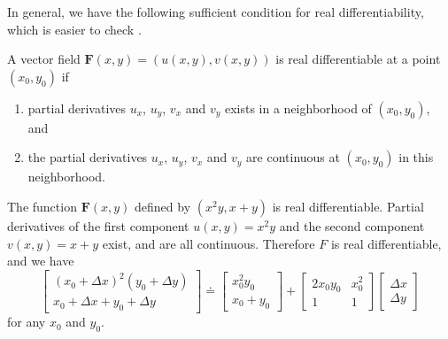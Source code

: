 In general, we have the following sufficient condition for real differentiability, which is easier to check \cite[Theorem 9.21]{Rudin}.

\renewcommand{\labelenumi}{(\roman{enumi}).}
\begin{svgraybox} 		\label{thm:real_sufficient}
	\begin{theorem} A vector field $\mathbf{F}(x,y) = (u(x,y), v(x,y))$ is real differentiable at a point $(x_0,y_0)$ if 
\begin{enumerate}
\item partial derivatives $u_x$, $u_y$, $v_x$ and $v_y$ exists in a neighborhood of $(x_0,y_0)$, and 
\item the partial derivatives $u_x$, $u_y$, $v_x$ and $v_y$ are continuous at $(x_0,y_0)$ in this neighborhood.
\end{enumerate}
	\end{theorem}
\end{svgraybox}



\begin{example}
	The function $\mathbf{F}(x,y)$ defined by $(x^2y, x+y)$ is real differentiable. Partial derivatives of the first component $u(x,y)=x^2y$ and the second component $v(x,y)=x+y$ exist, and are all continuous. Therefore $F$ is real differentiable, 	
	 and we have
	\begin{equation}
		\begin{bmatrix}(x_0+\Delta x)^2 (y_0 + \Delta y)\\ x_0+\Delta x + y_0 + \Delta y \end{bmatrix}
		\doteq
		\begin{bmatrix}x_0^2 y_0 \\ x_0+y_0 \end{bmatrix} +
		\begin{bmatrix} 2x_0y_0 & x_0^2 \\ 1 & 1 \end{bmatrix}
		\begin{bmatrix} \Delta x \\ \Delta y \end{bmatrix}
	\end{equation}
	for any $x_0$ and $y_0$.
	\label{ex:5A}
\end{example}

